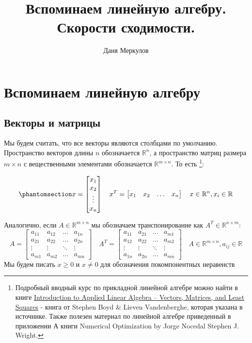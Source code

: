 \documentclass[
  russian,
  letterpaper,
  DIV=11,
  numbers=noendperiod]{scrartcl}
\title{Вспоминаем линейную алгебру. Скорости сходимости.}
\author{Даня Меркулов}
\date{}
\begin{document}
\maketitle


\section{Вспоминаем линейную
алгебру}\label{ux432ux441ux43fux43eux43cux438ux43dux430ux435ux43c-ux43bux438ux43dux435ux439ux43dux443ux44e-ux430ux43bux433ux435ux431ux440ux443}

\subsection{Векторы и
матрицы}\label{ux432ux435ux43aux442ux43eux440ux44b-ux438-ux43cux430ux442ux440ux438ux446ux44b}

Мы будем считать, что все векторы являются столбцами по умолчанию.
Пространство векторов длины \(n\) обозначается \(\mathbb{R}^n\), а
пространство матриц размера \(m \times n\) с вещественными элементами
обозначается \(\mathbb{R}^{m \times n}\). То есть \footnote{Подробный
  вводный курс по прикладной линейной алгебре можно найти в книге
  \href{https://web.stanford.edu/~boyd/vmls/}{Introduction to Applied
  Linear Algebra -- Vectors, Matrices, and Least Squares} - книга от
  Stephen Boyd \& Lieven Vandenberghe, которая указана в источнике.
  Также полезен материал по линейной алгебре приведенный в приложении А
  книги Numerical Optimization by Jorge Nocedal Stephen J. Wright.}:

\begin{equation}\phantomsection\label{eq-vector}{
x = \begin{bmatrix}
x_1 \\
x_2 \\
\vdots \\
x_n
\end{bmatrix} \quad x^T = \begin{bmatrix}
x_1 & x_2 & \dots & x_n
\end{bmatrix} \quad x \in \mathbb{R}^n, x_i \in \mathbb{R}
}\end{equation}

Аналогично, если \(A \in \mathbb{R}^{m \times n}\) мы обозначаем
транспонирование как \(A^T \in \mathbb{R}^{n \times m}\): \[
A = \begin{bmatrix}
a_{11} & a_{12} & \dots & a_{1n} \\
a_{21} & a_{22} & \dots & a_{2n} \\
\vdots & \vdots & \ddots & \vdots \\
a_{m1} & a_{m2} & \dots & a_{mn}
\end{bmatrix} \quad A^T = \begin{bmatrix}
a_{11} & a_{21} & \dots & a_{m1} \\
a_{12} & a_{22} & \dots & a_{m2} \\
\vdots & \vdots & \ddots & \vdots \\
a_{1n} & a_{2n} & \dots & a_{mn}
\end{bmatrix} \quad A \in \mathbb{R}^{m \times n}, a_{ij} \in \mathbb{R}
\] Мы будем писать \(x \geq 0\) и \(x \neq 0\) для обозначения
покомпонентных неравенств
\end{document}
